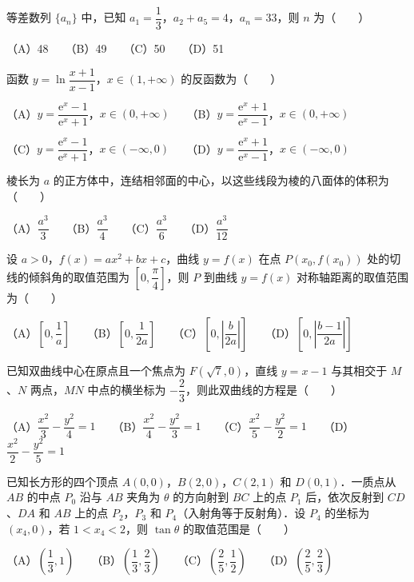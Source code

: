 \begin{question}
等差数列 $\{a_n\}$ 中，已知 $a_1 = \dfrac{1}{3}$，$a_2 + a_5 = 4$，$a_n = 33$，则 $n$ 为\mbox{（　　）}

（A）48　　（B）49　　（C）50　　（D）51

\end{question}
\begin{question}
函数 $y = \ln\dfrac{x+1}{x-1}$，$x \in (1, +\infty)$ 的反函数为\mbox{（　　）}

（A）$y = \dfrac{\mathrm{e}^x - 1}{\mathrm{e}^x + 1}$，$x \in (0, +\infty)$　　（B）$y = \dfrac{\mathrm{e}^x + 1}{\mathrm{e}^x - 1}$，$x \in (0, +\infty)$

（C）$y = \dfrac{\mathrm{e}^x - 1}{\mathrm{e}^x + 1}$，$x \in (-\infty, 0)$　　（D）$y = \dfrac{\mathrm{e}^x + 1}{\mathrm{e}^x - 1}$，$x \in (-\infty, 0)$

\end{question}
\begin{question}
棱长为 $a$ 的正方体中，连结相邻面的中心，以这些线段为棱的八面体的体积为\mbox{（　　）}

（A）$\dfrac{a^3}{3}$　　（B）$\dfrac{a^3}{4}$　　（C）$\dfrac{a^3}{6}$　　（D）$\dfrac{a^3}{12}$

\end{question}
\begin{question}
设 $a > 0$，$f(x) = ax^2 + bx + c$，曲线 $y = f(x)$ 在点 $P(x_0, f(x_0))$ 处的切线的倾斜角的取值范围为 $\left[0, \dfrac{\pi}{4}\right]$，则 $P$ 到曲线 $y = f(x)$ 对称轴距离的取值范围为\mbox{（　　）}

（A）$\left[0, \dfrac{1}{a}\right]$　　（B）$\left[0, \dfrac{1}{2a}\right]$　　（C）$\left[0, \left|\dfrac{b}{2a}\right|\right]$　　（D）$\left[0, \left|\dfrac{b-1}{2a}\right|\right]$

\end{question}
\begin{question}
已知双曲线中心在原点且一个焦点为 $F(\sqrt{7}, 0)$，直线 $y = x - 1$ 与其相交于 $M$、$N$ 两点，$MN$ 中点的横坐标为 $-\dfrac{2}{3}$，则此双曲线的方程是\mbox{（　　）}

（A）$\dfrac{x^2}{3} - \dfrac{y^2}{4} = 1$　　（B）$\dfrac{x^2}{4} - \dfrac{y^2}{3} = 1$　　（C）$\dfrac{x^2}{5} - \dfrac{y^2}{2} = 1$　　（D）$\dfrac{x^2}{2} - \dfrac{y^2}{5} = 1$

\end{question}
\begin{question}
已知长方形的四个顶点 $A(0, 0)$，$B(2, 0)$，$C(2, 1)$ 和 $D(0, 1)$．一质点从 $AB$ 的中点 $P_0$ 沿与 $AB$ 夹角为 $\theta$ 的方向射到 $BC$ 上的点 $P_1$ 后，依次反射到 $CD$、$DA$ 和 $AB$ 上的点 $P_2$，$P_3$ 和 $P_4$（入射角等于反射角）．设 $P_4$ 的坐标为 $(x_4, 0)$，若 $1 < x_4 < 2$，则 $\tan\theta$ 的取值范围是\mbox{（　　）}

（A）$\left(\dfrac{1}{3}, 1\right)$　　（B）$\left(\dfrac{1}{3}, \dfrac{2}{3}\right)$　　（C）$\left(\dfrac{2}{5}, \dfrac{1}{2}\right)$　　（D）$\left(\dfrac{2}{5}, \dfrac{2}{3}\right)$

\end{question}
